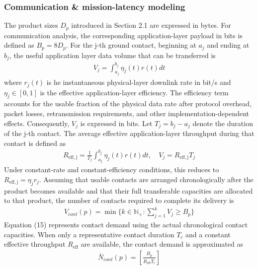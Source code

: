 \documentclass[a4paper,fleqn]{cas-dc}
\begin{document}
\subsubsection{Communication \& mission-latency modeling}
The product sizes \(D_p\) introduced in Section 2.1 are expressed in bytes. For communication analysis, the corresponding application-layer payload in bits is defined as \(B_p= 8D_p\). 
For the j-th ground contact, beginning at \(a_j\) and ending at \(b_j\), the useful application layer data volume that can be transferred is
\begin{eqnarray}
	V_j = \int_{a_j}^{b_j} \eta_j (t)r(t)dt
\end{eqnarray}
where \(r_j(t)\) is he instantaneous physical-layer downlink rate in bit/s and \(\eta_j  \in [0,1]\) is the effective application-layer efficiency. The efficiency term accounts for the usable fraction of the physical data rate after protocol overhead, packet losses, retransmission requirements, and other implementation-dependent effects. Consequently, \(V_j\) is expressed in bits. Let \(T_j  = b_j - a_j\) denote the duration of the j-th contact. The average effective application-layer throughput during that contact is defined as
\begin{eqnarray}
	R_{\mathrm{eff, j}} = \frac{1}{T_j}\int_{a_j}^{b_j} \eta_j (t)r(t)dt, \quad V_j = R_{\mathrm{eff, j}}T_j
\end{eqnarray}
Under constant-rate and constant-efficiency conditions, this reduces to \(R_{\mathrm{eff, j}} = \eta_j r_j\). Assuming that usable contacts are arranged chronologically after the product becomes available and that their full transferable capacities are allocated to that product, the number of contacts required to complete its delivery is
\begin{eqnarray}
	V_{cont}(p) = \min \{k \in \mathbb{N}_+ : \sum_{j=1}^{k} V_j \geq B_p\}
\end{eqnarray}
Equation (15) represents contact demand using the actual chronological contact capacities. When only a representative contact duration \(T_c\) and a constant effective throughput \(R_{\mathrm{eff}}\) are available, the contact demand is approximated as
\begin{eqnarray}
	\bar{N}_{cont}(p) = \left[\frac{B_p}{R_{\mathrm{eff}}\bar{T}_c}\right]
\end{eqnarray}
\end{document}
